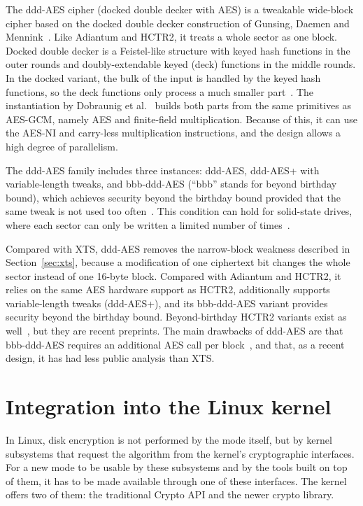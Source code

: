 \documentclass[
  digital,     %
  oneside,     %
  nosansbold,  %
  nocolorbold, %
  lof,         %
  lot,         %
]{fithesis4}
\begin{document}
The ddd-AES cipher (docked double decker with AES) is a tweakable wide-block cipher based on the docked double decker construction of Gunsing, Daemen and Mennink~\cite{gunsing_deck-based_2020}. Like Adiantum and HCTR2, it treats a whole sector as one block. Docked double decker is a Feistel-like structure with keyed hash functions in the outer rounds and doubly-extendable keyed (deck) functions in the middle rounds. In the docked variant, the bulk of the input is handled by the keyed hash functions, so the deck functions only process a much smaller part~\cite{gunsing_deck-based_2020}. The instantiation by Dobraunig et al.~\cite{fehr_efficient_2025} builds both parts from the same primitives as AES-GCM, namely AES and finite-field multiplication. Because of this, it can use the AES-NI and carry-less multiplication instructions, and the design allows a high degree of parallelism.

The ddd-AES family includes three instances: ddd-AES, ddd-AES+ with variable-length tweaks, and bbb-ddd-AES (``bbb'' stands for beyond birthday bound), which achieves security beyond the birthday bound provided that the same tweak is not used too often~\cite{fehr_efficient_2025}. This condition can hold for solid-state drives, where each sector can only be written a limited number of times~\cite{gunsing_deck-based_2020}.

Compared with XTS, ddd-AES removes the narrow-block weakness described in Section~\ref{sec:xts}, because a modification of one ciphertext bit changes the whole sector instead of one 16-byte block. Compared with Adiantum and HCTR2, it relies on the same AES hardware support as HCTR2, additionally supports variable-length tweaks (ddd-AES+), and its bbb-ddd-AES variant provides security beyond the birthday bound. Beyond-birthday HCTR2 variants exist as well~\cite{ozturk_hctr_2026, chen_beyond-birthday-bound_2026}, but they are recent preprints. The main drawbacks of ddd-AES are that bbb-ddd-AES requires an additional AES call per block~\cite{fehr_efficient_2025}, and that, as a recent design, it has had less public analysis than XTS.

\chapter{Integration into the Linux kernel}
\label{chap:integration}

In Linux, disk encryption is not performed by the mode itself, but by kernel subsystems that request the algorithm from the kernel's cryptographic interfaces. For a new mode to be usable by these subsystems and by the tools built on top of them, it has to be made available through one of these interfaces. The kernel offers two of them: the traditional Crypto API and the newer crypto library. 
\end{document}
